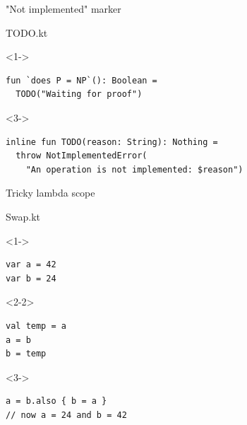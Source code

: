 \documentclass[hyperref={pdfpagelabels=false},xcolor={dvipsnames},compress]{beamer}
\begin{document}
    \begin{frame}[fragile]{"Not implemented" marker}
        \begin{exampleblock}{TODO.kt}
            \begin{onlyenv}<1->
                \begin{lstlisting}
fun `does P = NP`(): Boolean =
  TODO("Waiting for proof")
                \end{lstlisting}
            \end{onlyenv}
            \begin{onlyenv}<3->
                \begin{lstlisting}
inline fun TODO(reason: String): Nothing =
  throw NotImplementedError(
    "An operation is not implemented: $reason")
                \end{lstlisting}
            \end{onlyenv}
        \end{exampleblock}
    \end{frame}

    \begin{frame}[fragile]{Tricky lambda scope}
        \begin{exampleblock}{Swap.kt}
            \begin{onlyenv}<1->
                \begin{lstlisting}
var a = 42
var b = 24
                \end{lstlisting}
            \end{onlyenv}
            \begin{onlyenv}<2-2>
                \begin{lstlisting}
val temp = a
a = b
b = temp
                \end{lstlisting}
            \end{onlyenv}
            \begin{onlyenv}<3->
                \begin{lstlisting}
a = b.also { b = a }
// now a = 24 and b = 42
                \end{lstlisting}
            \end{onlyenv}
        \end{exampleblock}
    \end{frame}
\end{document}
